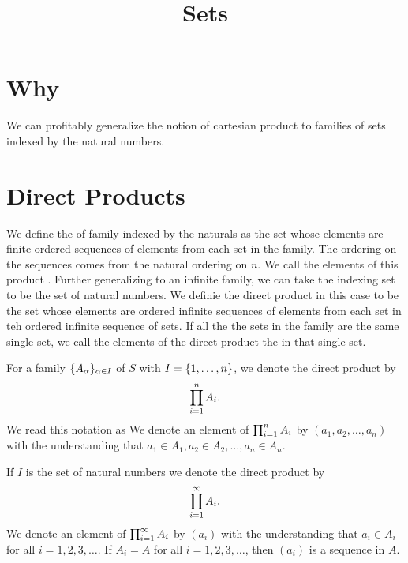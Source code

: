






\title{Sets}

\section{Why}

We can profitably generalize the notion of cartesian product to families of sets indexed by the natural numbers.

\section{Direct Products}

We define the  of family indexed by the naturals as the set whose elements are finite ordered sequences of elements from each set in the family.
The ordering on the sequences comes from the natural ordering on $n$.
We call the elements of this product .
Further generalizing to an infinite family, we can take the indexing set to be the set of natural numbers.
We definie the direct product in this case to be the set whose elements are ordered infinite sequences of elements from each set in teh ordered infinite sequence of sets.
If all the the sets in the family are the same single set, we call the elements of the direct product the  in that single set.


For a family $\{A_{\alpha}\}_{\alpha \in I}$ of $S$ with $I = \{1, \dots, n\}$, we denote the direct product by
\[
  \prod_{i = 1}^{n} A_{i}.
\]
We read this notation as 
We denote an element of $\prod_{i = 1}^{n} A_{i}$ by $(a_1, a_2, \dots, a_n)$ with the understanding that $a_1 \in A_1, a_2 \in A_2, \dots, a_n \in A_n$.

If $I$ is the set of natural numbers we denote the direct product by
\[
  \prod_{i = 1}^{\infty} A_{i}.
\]
We denote an element of $\prod_{i = 1}^{\infty} A_{i}$ by $(a_i)$ with the understanding that $a_i \in A_i$ for all $i = 1,2,3,\dots$.
If $A_i = A$ for all $i = 1, 2, 3,\dots$, then $(a_i)$ is a sequence in $A$.


